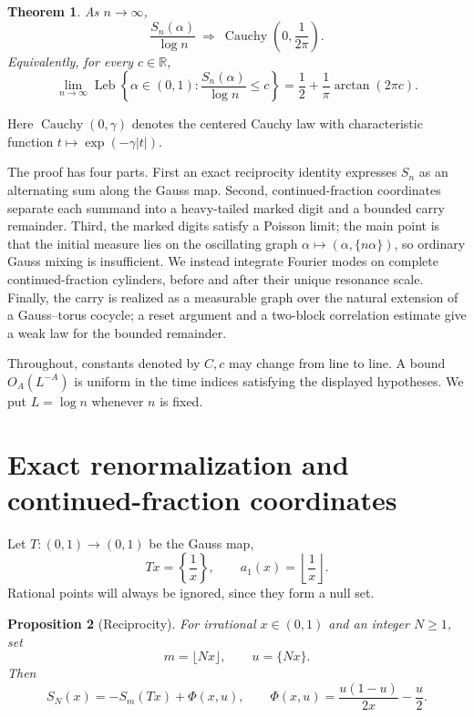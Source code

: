 \documentclass[11pt,a4paper]{amsart}
\newtheorem{theorem}{Theorem}[section]
\newtheorem{proposition}[theorem]{Proposition}
\theoremstyle{definition}
\theoremstyle{remark}
\newcommand{\R}{\mathbb R}
\newcommand{\Leb}{\operatorname{Leb}}
\begin{document}
\begin{theorem}\label{thm:main}
As $n\to\infty$,
\[
 \frac{S_n(\alpha)}{\log n}
 \ \Longrightarrow\
 \operatorname{Cauchy}\!\left(0,\frac1{2\pi}\right).
\]
Equivalently, for every $c\in\R$,
\[
 \lim_{n\to\infty}\Leb\left\{\alpha\in(0,1):
 \frac{S_n(\alpha)}{\log n}\le c\right\}
 =\frac12+\frac1\pi\arctan(2\pi c).
\]
\end{theorem}

Here $\operatorname{Cauchy}(0,\gamma)$ denotes the centered Cauchy law with
characteristic function $t\mapsto\exp(-\gamma|t|)$.

The proof has four parts.  First an exact reciprocity identity expresses
$S_n$ as an alternating sum along the Gauss map.  Second, continued-fraction
coordinates separate each summand into a heavy-tailed marked digit and a
bounded carry remainder.  Third, the marked digits satisfy a Poisson limit;
the main point is that the initial measure lies on the oscillating graph
$\alpha\mapsto(\alpha,\{n\alpha\})$, so ordinary Gauss mixing is insufficient.
We instead integrate Fourier modes on complete continued-fraction cylinders,
before and after their unique resonance scale.  Finally, the carry is realized
as a measurable graph over the natural extension of a Gauss--torus cocycle;
a reset argument and a two-block correlation estimate give a weak law for the
bounded remainder.

Throughout, constants denoted by $C,c$ may change from line to line.  A bound
$O_A(L^{-A})$ is uniform in the time indices satisfying the displayed
hypotheses.  We put $L=\log n$ whenever $n$ is fixed.

\section{Exact renormalization and continued-fraction coordinates}

Let $T:(0,1)\to(0,1)$ be the Gauss map,
\[
 Tx=\left\{\frac1x\right\},
 \qquad a_1(x)=\left\lfloor\frac1x\right\rfloor.
\]
Rational points will always be ignored, since they form a null set.

\begin{proposition}[Reciprocity]\label{prop:reciprocity}
For irrational $x\in(0,1)$ and an integer $N\ge1$, set
\[
 m=\lfloor Nx\rfloor,\qquad u=\{Nx\}.
\]
Then
\begin{equation}\label{eq:reciprocity}
 S_N(x)=-S_m(Tx)+\Phi(x,u),
 \qquad
 \Phi(x,u)=\frac{u(1-u)}{2x}-\frac u2.
\end{equation}
\end{proposition}
\end{document}
